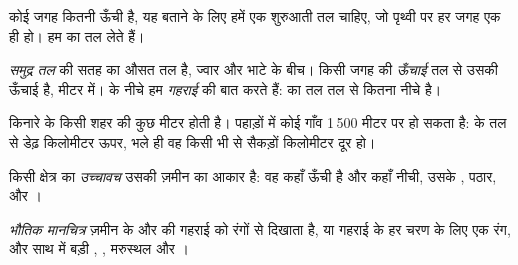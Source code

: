 कोई जगह कितनी ऊँची है, यह बताने के लिए हमें एक शुरुआती तल चाहिए, जो पृथ्वी पर
हर जगह एक ही हो। हम  का तल लेते हैं।

\begin{definition}[ऊँचाई और समुद्र तल]\label{def:g4:world-physical-map:altitude}
\emph{समुद्र तल}  की सतह का औसत तल है, ज्वार और भाटे के
बीच। किसी जगह की \emph{ऊँचाई}  तल से उसकी ऊँचाई है, मीटर में।
 के नीचे हम \emph{गहराई} की बात करते हैं:  का तल  तल से कितना
नीचे है।
\end{definition}

 किनारे के किसी शहर की  कुछ मीटर होती है। पहाड़ों में कोई गाँव
1\,500 मीटर पर हो सकता है:  के तल से डेढ़ किलोमीटर ऊपर, भले ही वह किसी भी
 से सैकड़ों किलोमीटर दूर हो।

\begin{definition}[उच्चावच]\label{def:g4:world-physical-map:relief}
किसी क्षेत्र का \emph{उच्चावच} उसकी ज़मीन का आकार है: वह कहाँ ऊँची
है और कहाँ नीची, उसके , पठार,  और
।
\end{definition}

\begin{definition}[भौतिक मानचित्र]\label{def:g4:world-physical-map:physical-map}
\emph{भौतिक मानचित्र} ज़मीन के  और  की गहराई को
रंगों से दिखाता है,  या गहराई के हर चरण के लिए एक रंग, और साथ में बड़ी
, , मरुस्थल और ।
\end{definition}

